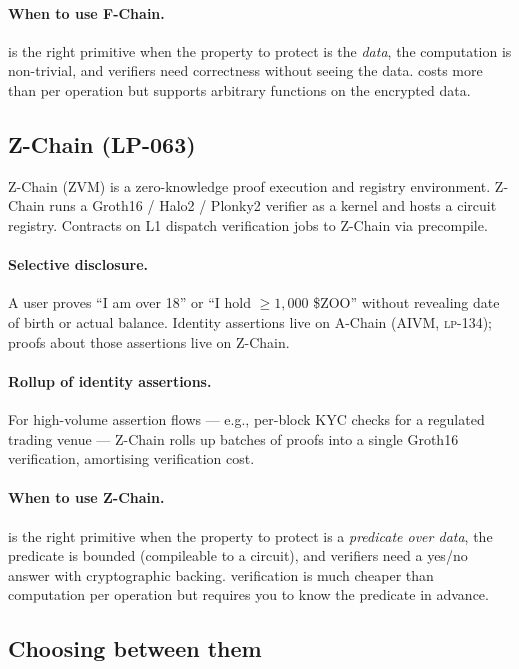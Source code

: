 \paragraph{When to use F-Chain.}
\FHE{} is the right primitive when the property to protect is the
\emph{data}, the computation is non-trivial, and verifiers need
correctness without seeing the data. \FHE{} costs more than \ZKP{}
per operation but supports arbitrary functions on the encrypted
data.

\subsection{Z-Chain \ZKP{} (LP-063)}

Z-Chain (ZVM) is a zero-knowledge proof execution and registry
environment. Z-Chain runs a Groth16 / Halo2 / Plonky2 verifier as a
\GPU{} kernel and hosts a circuit registry. Contracts on \Zoo{} L1
dispatch verification jobs to Z-Chain via precompile.

\paragraph{Selective disclosure.}
A user proves ``I am over 18'' or ``I hold $\geq 1{,}000$ \$ZOO''
without revealing date of birth or actual balance. Identity
assertions live on A-Chain (AIVM, \textsc{lp-134}); proofs about
those assertions live on Z-Chain.

\paragraph{Rollup of identity assertions.}
For high-volume assertion flows --- e.g., per-block KYC checks for a
regulated trading venue --- Z-Chain rolls up batches of proofs
into a single Groth16 verification, amortising verification cost.

\paragraph{When to use Z-Chain.}
\ZKP{} is the right primitive when the property to protect is a
\emph{predicate over data}, the predicate is bounded (compileable
to a circuit), and verifiers need a yes/no answer with cryptographic
backing. \ZKP{} verification is much cheaper than \FHE{} computation
per operation but requires you to know the predicate in advance.

\subsection{Choosing between them}

